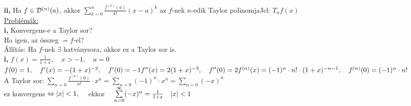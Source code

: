 \documentclass[a4paper,11pt]{article}
\begin{document}
\textbf{ii,} Ha $f\in\mathcal{D}^{(n)}(a)$, akkor $\sum\limits_{k=0}^{n} 
\frac{f^{(k)}(a)}{k!}(x-a)^k$ az $f$-nek $n$-edik Taylor polinomja\hspace{1cm}Jel: 
$T_nf(x)$\\[0.2cm]
\underline{Problémák:}\\[0.2cm]\textbf{i,} Konvergens-e a Taylor sor?\\[0.2cm] 
Ha igen, az összeg $=f$-el?\\[0.2cm]Állítás: Ha $f$-nek $\exists$ hatványsora, 
akkor ez a Taylor sor is.\\[0.2cm]
\pl \textbf{i,} $f(x)=\frac{1}{1+x},\quad x>-1,\quad a=0$\\[0.2cm]$f(0)=1, \quad 
f'(x)=-(1+x)^{-2},\quad f'(0)=-1\\[0.2cm]f''(x)=2(1+x)^{-3},\quad 
f''(0)=2\\[0.2cm]f^{(n)}(x)=(-1)^n\cdot n!\cdot(1+x)^{-n-1},\quad 
f^{(n)}(0)=(-1)^n\cdot n!$\\[0.2cm]
A Taylor sor: $\sum\limits_{n=0}\frac{f^{(n)}(0)}{n!}\cdot x^n= 
\sum\limits_{n=0}(-1)^n\cdot x^n=\sum\limits_{n=0}(-x)^n$\\[0.2cm] ez konvergens 
$\Leftrightarrow\abs{x}<1,\quad$ ekkor $\quad\sum\limits_{n=0}^{\infty}
(-x)^n=\frac{1}{1+x}\quad\abs{x}<1$
\end{document}
